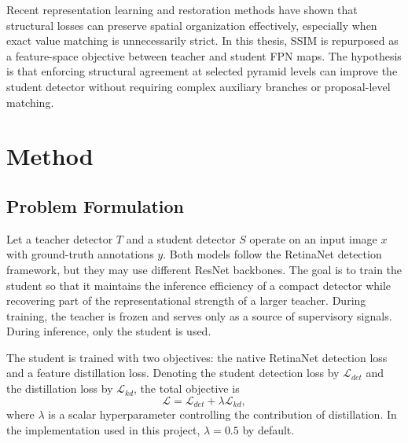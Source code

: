 \documentclass[12pt]{article}
\begin{document}
Recent representation learning and restoration methods have shown that structural losses can preserve spatial organization effectively, especially when exact value matching is unnecessarily strict. In this thesis, SSIM is repurposed as a feature-space objective between teacher and student FPN maps. The hypothesis is that enforcing structural agreement at selected pyramid levels can improve the student detector without requiring complex auxiliary branches or proposal-level matching.

\section{Method}
\subsection{Problem Formulation}
Let a teacher detector $T$ and a student detector $S$ operate on an input image $x$ with ground-truth annotations $y$. Both models follow the RetinaNet detection framework, but they may use different ResNet backbones. The goal is to train the student so that it maintains the inference efficiency of a compact detector while recovering part of the representational strength of a larger teacher. During training, the teacher is frozen and serves only as a source of supervisory signals. During inference, only the student is used.

The student is trained with two objectives: the native RetinaNet detection loss and a feature distillation loss. Denoting the student detection loss by $\mathcal{L}_{det}$ and the distillation loss by $\mathcal{L}_{kd}$, the total objective is
\begin{equation}
\mathcal{L} = \mathcal{L}_{det} + \lambda \mathcal{L}_{kd},
\end{equation}
where $\lambda$ is a scalar hyperparameter controlling the contribution of distillation. In the implementation used in this project, $\lambda=0.5$ by default.
\end{document}
